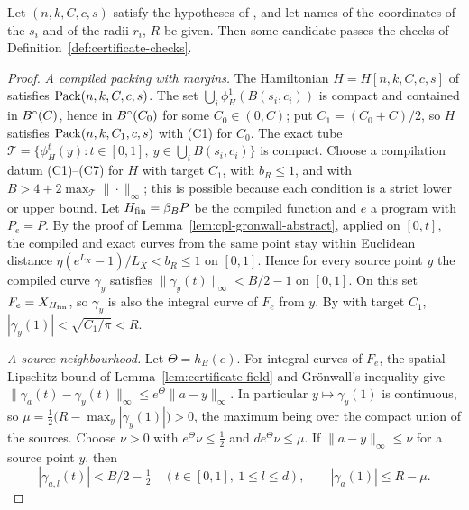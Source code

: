 \begin{theorem}[Nonemptiness]\label{thm:certificate-exists}
Let $(n,k,C,c,s)$ satisfy the hypotheses of , and let names of the coordinates of the $s_i$
and of the radii $r_i$, $R$ be given. Then some candidate passes the checks of
Definition~\ref{def:certificate-checks}.
\end{theorem}

\begin{proof}
\emph{A compiled packing with margins.} The Hamiltonian $H=H[n,k,C,c,s]$ of  satisfies
$\mathrm{Pack}(n,k,C,c,s)$. The set $\bigcup_i\phi^1_H(B(s_i,c_i))$ is compact and contained in $B^{\circ}(C)$, hence in $B^{\circ}(C_0)$ for
some $C_0\in(0,C)$; put $C_1=(C_0+C)/2$, so $H$ satisfies $\mathrm{Pack}(n,k,C_1,c,s)$ with (C1) for $C_0$. The exact tube
$\mathcal T=\{\phi^t_H(y):t\in[0,1],\ y\in\bigcup_iB(s_i,c_i)\}$ is compact. Choose a compilation datum (C1)--(C7) for
$H$ with target $C_1$, with $b_R\le1$, and with $B>4+2\max_{\mathcal T}\|\cdot\|_\infty$; this is possible because
each condition is a strict lower or upper bound. Let $H_{\mathrm{fin}}=\beta_BP$ be the compiled function and $e$ a program with
$P_e=P$. By the proof of Lemma~\ref{lem:cpl-gronwall-abstract}, applied on $[0,t]$, the compiled and exact curves from
the same point stay within Euclidean distance $\eta(e^{L_X}-1)/L_X<b_R\le1$ on $[0,1]$. Hence for every source point
$y$ the compiled curve $\gamma_y$ satisfies $\|\gamma_y(t)\|_\infty<B/2-1$ on $[0,1]$. On this set $F_e=X_{H_{\mathrm{fin}}}$, so
$\gamma_y$ is also the integral curve of $F_e$ from $y$. By  with target $C_1$,
$|\gamma_y(1)|<\sqrt{C_1/\pi}<R$.

\emph{A source neighbourhood.} Let $\Theta=h_B(e)$. For integral curves of $F_e$, the spatial Lipschitz bound of
Lemma~\ref{lem:certificate-field} and Gr\"onwall's inequality give
$\|\gamma_a(t)-\gamma_y(t)\|_\infty\le e^\Theta\|a-y\|_\infty$. In particular $y\mapsto\gamma_y(1)$ is continuous, so
$\mu=\frac12\bigl(R-\max_y|\gamma_y(1)|\bigr)>0$, the maximum being over the compact union of the sources. Choose
$\nu>0$ with $e^\Theta\nu\le\frac12$ and $de^\Theta\nu\le\mu$. If $\|a-y\|_\infty\le\nu$ for a source point $y$, then
\begin{equation}\label{eq:certificate-margins}
 |\gamma_{a,l}(t)|<B/2-\tfrac12\quad(t\in[0,1],\ 1\le l\le d),\qquad |\gamma_a(1)|\le R-\mu .
\end{equation}


\end{proof}
